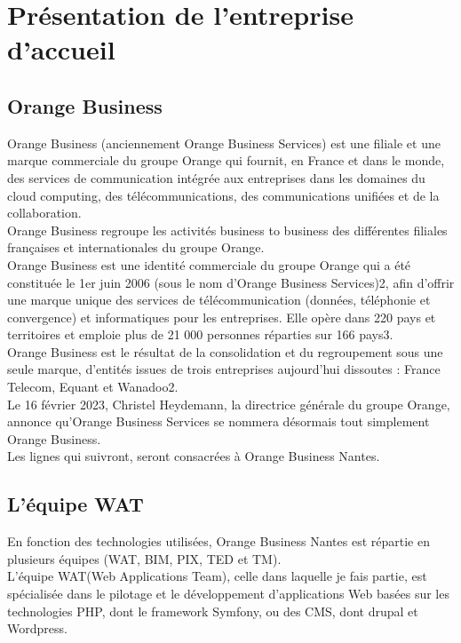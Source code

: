 \chapter{Présentation de l'entreprise d'accueil}
\section{Orange Business}
	Orange Business (anciennement Orange Business Services) est une filiale et une marque commerciale du groupe Orange qui fournit, en France et dans le monde, des services de communication intégrée aux entreprises dans les domaines du cloud computing, des télécommunications, des communications unifiées et de la collaboration.\\
	Orange Business regroupe les activités business to business des différentes filiales françaises et internationales du groupe Orange.\cite{orange_business}\\
	
	Orange Business est une identité commerciale du groupe Orange qui a été constituée le 1er juin 2006 (sous le nom d'Orange Business Services)2, afin d'offrir une marque unique des services de télécommunication (données, téléphonie et convergence) et informatiques pour les entreprises. Elle opère dans 220 pays et territoires et emploie plus de 21 000 personnes réparties sur 166 pays3.\\
	
	Orange Business est le résultat de la consolidation et du regroupement sous une seule marque, d’entités issues de trois entreprises aujourd’hui dissoutes : France Telecom, Equant et Wanadoo2.\\
	
	Le 16 février 2023, Christel Heydemann, la directrice générale du groupe Orange, annonce qu'Orange Business Services se nommera désormais tout simplement Orange Business.\cite{orange_business}\\
	
	Les lignes qui suivront, seront consacrées à Orange Business Nantes.
	
\section{L'équipe WAT} %
	En fonction des technologies utilisées, Orange Business Nantes est répartie en plusieurs équipes (WAT, BIM, PIX, TED et TM).\\
	
	L'équipe WAT(Web Applications Team), celle dans laquelle je fais partie, est spécialisée dans le pilotage et le développement d'applications Web basées sur les technologies PHP, dont le framework Symfony, ou des CMS, dont drupal et Wordpress.\\
	

